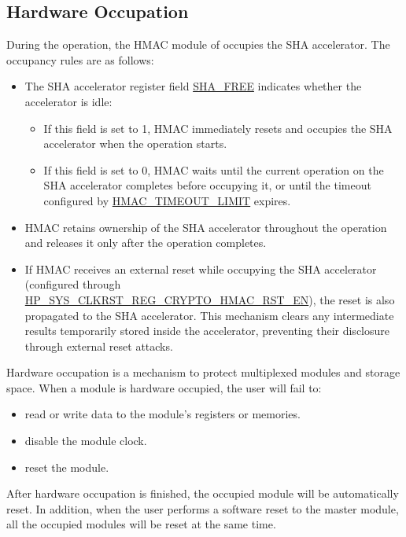 \documentclass[main\_\_EN.tex]{subfiles}
\begin{document}
\subsection{Hardware Occupation}

During the operation, the HMAC module of \chipname{} occupies the SHA accelerator. The occupancy rules are as follows:

\begin{itemize}
    \item The SHA accelerator register field \hyperref[fielddesc:SHAFREE]{SHA\_FREE} indicates whether the accelerator is idle:
    \begin{itemize}
        \item If this field is set to 1, HMAC immediately resets and occupies the SHA accelerator when the operation starts.
        \item If this field is set to 0, HMAC waits until the current operation on the SHA accelerator completes before occupying it, or until the timeout configured by \hyperref[fielddesc:HMACTIMEOUTLIMIT]{HMAC\_TIMEOUT\_LIMIT} expires.
    \end{itemize}

    \item HMAC retains ownership of the SHA accelerator throughout the operation and releases it only after the operation completes.

    \item If HMAC receives an external reset while occupying the SHA accelerator (configured through \hyperref[fielddesc:HPSYSCLKRSTREGCRYPTOHMACRSTEN]{HP\_SYS\_CLKRST\_REG\_CRYPTO\_HMAC\_RST\_EN}), the reset is also propagated to the SHA accelerator. This mechanism clears any intermediate results temporarily stored inside the accelerator, preventing their disclosure through external reset attacks.
\end{itemize}

\begin{tiplisting}
    Hardware occupation is a mechanism to protect multiplexed modules and storage space. When a module is hardware occupied, the user will fail to:
    \vspace{-0.5em}
    \begin{itemize}
        \item read or write data to the module's registers or memories.
        \item disable the module clock.
        \item reset the module.
    \end{itemize}
    \vspace{-0.5em}
    After hardware occupation is finished, the occupied module will be automatically reset. In addition, when the user performs a software reset to the master module, all the occupied modules will be reset at the same time.
    \end{tiplisting}
\end{document}
